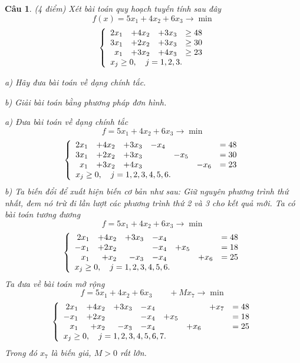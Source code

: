 \documentclass[12pt,a4letter]{article}
\newtheorem{btbt}{Câu}%
\newenvironment{cauhoi}{\begin{btbt}\rm }{\end{btbt}}
\begin{document}
\begin{cauhoi}%
(4 điểm)
Xét bài toán quy hoạch tuyến tính sau đây
$$ f(x)=5x_1+4x_2+6x_3\rightarrow \min$$
\begin{equation*}
\left\{
\begin{array}{r r r l }
2x_1&+4x_2&+3x_3&\ge 48 \\ 
3x_1&+2x_2&+3x_3&\ge 30 \\ 
x_1&+3x_2&+4x_3&\ge 23 \\ 
\multicolumn{4}{l}{x_j\ge 0,\quad j = 1, 2, 3.}\\
\end{array}
\right.
\end{equation*}

a) Hãy đưa bài toán về dạng chính tắc.

b) Giải bài toán bằng phương pháp đơn hình.

\begin{traloi}
a) Đưa bài toán về dạng chính tắc
$$ f=5x_1+4x_2+6x_3\rightarrow \min$$
\begin{equation*}
\left\{
\begin{array}{r r r r r  r l }
2x_1&+4x_2&+3x_3&-x_4&&&= 48 \\ 
3x_1&+2x_2&+3x_3&&-x_5&&= 30 \\ 
x_1&+3x_2&+4x_3&&&-x_6&= 23 \\ 
\multicolumn{6}{l}{x_j\ge 0,\quad j = 1, 2, 3, 4, 5, 6.}\\
\end{array}
\right.
\end{equation*}
b) Ta biến đổi để xuất hiện biến cơ bản như sau:  Giữ nguyên phương trình thứ nhất, đem nó trừ đi lần lượt các phương trình thứ 2 và 3 cho kết quả mới. Ta có bài toán tương đương
$$ f=5x_1+4x_2+6x_3\rightarrow \min$$
\begin{equation*}
\left\{
\begin{array}{r r r r r  r l }
2x_1&+4x_2&+3x_3&-x_4&&&= 48 \\ 
-x_1&+2x_2&&-x_4&+x_5&&= 18 \\ 
x_1&+x_2&-x_3&-x_4&&+x_6&= 25 \\ 
\multicolumn{6}{l}{x_j\ge 0,\quad j = 1, 2, 3, 4, 5, 6.}\\
\end{array}
\right.
\end{equation*}
Ta đưa về bài toán mở rộng
$$ f=5x_1+4x_2+6x_3\qquad +Mx_7\rightarrow \min$$
\begin{equation*}
\left\{
\begin{array}{r r r r r  r r l }
2x_1&+4x_2&+3x_3&-x_4&&&+x_7&= 48 \\ 
-x_1&+2x_2&&-x_4&+x_5&&&= 18 \\ 
x_1&+x_2&-x_3&-x_4&&+x_6&&= 25 \\ 
\multicolumn{6}{l}{x_j\ge 0,\quad j = 1, 2, 3, 4, 5, 6,7.}\\
\end{array}
\right.
\end{equation*}
Trong đó $x_7$ là biến giả, $M>0$ rất lớn.


\end{traloi}
\end{cauhoi}
\end{document}
